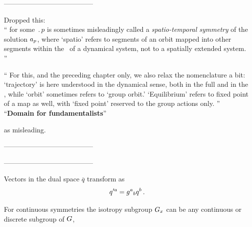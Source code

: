---------------------------------------

Dropped this: \\
``
 for some  $\period{p}$ is sometimes
 misleadingly called a \emph{spatio-temporal symmetry} of the
 solution $a_p$, where `spatio' refers to segments of an
 orbit mapped into other segments within the \statesp\ of a
 dynamical system, not to a spatially extended system.
 ''

``
For this, and the preceding chapter only, we also relax the nomenclature
a bit:
   `trajectory' is here understood in the dynamical sense,
   both in the full and in the \reducedsp,
   while `orbit' sometimes refers to `group orbit.'
   `Equilibrium' refers to fixed point of a map as well,
   with `fixed point' reserved to the group actions only.
''
``{\bf Domain for fundamentalists}''

as misleading.

---------------------------------------

    \PublicPrivate{
    }{%
A real $[\!2n\times\!2n]$ matrix of the form
\beq
H = \MatrixII{E}{F}{G}{-E^T}
\ee{HamMatr1}
is said to be Hamiltonian if $E, F, G \in \reals^{n \times n}$,
 with $F^T = F$ and $G^T = G$. Equivalently, one
may characterize the $[\!2n\times\!2n]$  Hamiltonian matrices $H$
in $\in \reals^{2n \times 2n}$ by
\beq
({\bf \omega}H)^T = {\bf \omega}H
\,.
\ee{HamMatr2a}
Or, equivalently:

Let $S$ be a real symmetric matrix. Matrices of the form ${\bf \omega}S$ are
called \emph{Hamiltonian matrices}. It is easily checked that
the exponential of
${\bf \omega}S$,
\index{Hamiltonian!matrix}
\beq
\LieEl = e^{{\bf \omega}S}
\ee{SymplExcp}
is a symplectic matrix.
     }%

---------------------------------------

Vectors in the dual space $\overline{q}$
transform as
\[
q'^a = \LieEl^a{}_b q^b \, .
\]


For continuous symmetries the isotropy subgroup $G_{{x}}$
can be any continuous or discrete subgroup of $G$,

